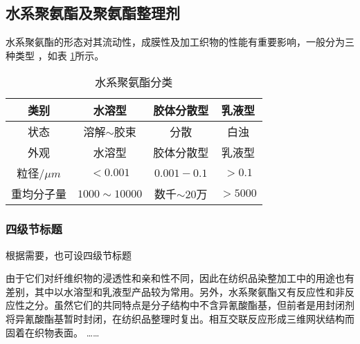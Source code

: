 \subsection{水系聚氨酯及聚氨酯整理剂}

水系聚氨酯的形态对其流动性，成膜性及加工织物的性能有重要影响，一般分为三种类型\cite{Jiang2005Size} ，如表 \ref{tab:category}所示。

\begin{table}
	\centering
	\caption{水系聚氨酯分类} \label{tab:category}
	\begin{tabular*}{0.9\textwidth}{@{\extracolsep{\fill}}cccc}
		\toprule
		类别			&水溶型		&胶体分散型		&乳液型 \\
		\midrule
		状态			&溶解$\sim$胶束	&分散		&白浊 \\
		外观			&水溶型		&胶体分散型		&乳液型 \\
		粒径$/\mu m$	&$<0.001$		&$0.001-0.1$		&$>0.1$ \\
		重均分子量	&$1000\sim 10000$	&数千$\sim 20万$ &$>5000$ \\
		\bottomrule
	\end{tabular*}
\end{table}

\subsubsection{四级节标题}

根据需要，也可设四级节标题

由于它们对纤维织物的浸透性和亲和性不同，因此在纺织品染整加工中的用途也有差别，其中以水溶型和乳液型产品较为常用。另外，水系聚氨酯又有反应性和非反应性之分。虽然它们的共同特点是分子结构中不含异氰酸酯基，但前者是用封闭剂将异氰酸酯基暂时封闭，在纺织品整理时复出。相互交联反应形成三维网状结构而固着在织物表面。
……



